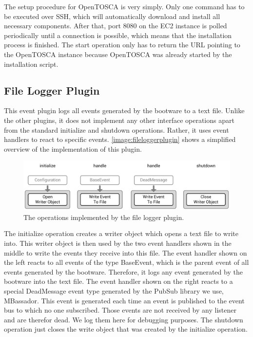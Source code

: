 The setup procedure for OpenTOSCA is very simply.
Only one command has to be executed over SSH, which will automatically download and install all necessary components.
After that, port 8080 on the EC2 instance is polled periodically until a connection is possible, which means that the installation process is finished.
The start operation only has to return the URL pointing to the OpenTOSCA instance because OpenTOSCA was already started by the installation script.

\subsection{File Logger Plugin}

This event plugin logs all events generated by the bootware to a text file.
Unlike the other plugins, it does not implement any other interface operations apart from the standard initialize and shutdown operations.
Rather, it uses event handlers to react to specific events.
\autoref{image:fileloggerplugin} shows a simplified overview of the implementation of this plugin.

\begin{figure}[!htbp]
	\centering
	\includegraphics[resolution=600]{implementation/assets/filelogger_plugin}
	\caption{The operations implemented by the file logger plugin.}
	\label{image:fileloggerplugin}
\end{figure}

The initialize operation creates a writer object which opens a text file to write into.
This writer object is then used by the two event handlers shown in the middle to write the events they receive into this file.
The event handler shown on the left reacts to all events of the type BaseEvent, which is the parent event of all events generated by the bootware.
Therefore, it logs any event generated by the bootware into the text file.
The event handler shown on the right reacts to a special DeadMessage event type generated by the PubSub library we use, MBassador.
This event is generated each time an event is published to the event bus to which no one subscribed.
Those events are not received by any listener and are therefor dead.
We log them here for debugging purposes.
The shutdown operation just closes the write object that was created by the initialize operation.
